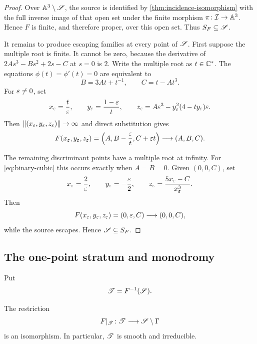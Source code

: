 \begin{proof}
Over $\mathbb A^3\setminus\mathscr S$, the source is identified by \cref{thm:incidence-isomorphism} with the full inverse image of that open set under the finite morphism $\pi\colon\mathcal I\to\mathbb A^3$.  Hence $F$ is finite, and therefore proper, over this open set.  Thus $S_F\subseteq\mathscr S$.

It remains to produce escaping families at every point of $\mathscr S$.  First suppose the multiple root is finite.  It cannot be zero, because the derivative of $2As^3-Bs^2+2s-C$ at $s=0$ is $2$.  Write the multiple root as $t\in\mathbb C^*$.  The equations $\phi(t)=\phi'(t)=0$ are equivalent to
\begin{equation}\label{eq:multiple-root-parameters}
  B=3At+t^{-1},
  \qquad
  C=t-At^3.
\end{equation}
For $\varepsilon\neq0$, set
\begin{equation}\label{eq:finite-escape}
  x_{\varepsilon}=\frac{t}{\varepsilon},
  \qquad
  y_{\varepsilon}=\frac{1-\varepsilon}{t},
  \qquad
  z_{\varepsilon}=A\varepsilon^3-y_{\varepsilon}^2(4-ty_{\varepsilon})\varepsilon.
\end{equation}
Then $\|(x_{\varepsilon},y_{\varepsilon},z_{\varepsilon})\|\to\infty$ and direct substitution gives
\[
  F(x_{\varepsilon},y_{\varepsilon},z_{\varepsilon})
  =\left(A,B-\frac{\varepsilon}{t},C+\varepsilon t\right)
  \longrightarrow(A,B,C).
\]

The remaining discriminant points have a multiple root at infinity.  For \eqref{eq:binary-cubic} this occurs exactly when $A=B=0$.  Given $(0,0,C)$, set
\begin{equation}\label{eq:infinity-escape}
  x_{\varepsilon}=\frac2{\varepsilon},
  \qquad
  y_{\varepsilon}=-\frac{\varepsilon}2,
  \qquad
  z_{\varepsilon}=\frac{5x_{\varepsilon}-C}{x_{\varepsilon}^3}.
\end{equation}
Then
\[
  F(x_{\varepsilon},y_{\varepsilon},z_{\varepsilon})=(0,\varepsilon,C)
  \longrightarrow(0,0,C),
\]
while the source escapes.  Hence $\mathscr S\subseteq S_F$.
\end{proof}

\subsection{The one-point stratum and monodromy}

\begin{notation}\label{not:T-stratum}
Put
\[
  \mathscr T=F^{-1}(\mathscr S).
\]
\end{notation}

\begin{proposition}\label{prop:T-isomorphism}
The restriction
\[
  F|_{\mathscr T}\colon \mathscr T\longrightarrow\mathscr S\setminus\Gamma
\]
is an isomorphism.  In particular, $\mathscr T$ is smooth and irreducible.
\end{proposition}

